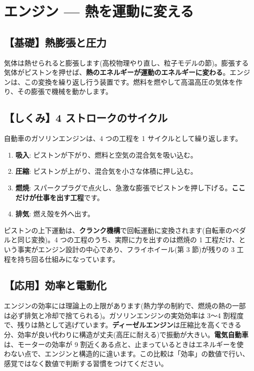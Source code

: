 \documentclass{article}
\begin{document}
\section{エンジン — 熱を運動に変える}

\subsection{【基礎】熱膨張と圧力}

気体は熱せられると膨張します(高校物理やり直し、粒子モデルの節)。膨張する気体がピストンを押せば、\textbf{熱のエネルギーが運動のエネルギーに変わる}。エンジンは、この変換を繰り返し行う装置です。燃料を燃やして高温高圧の気体を作り、その膨張で機械を動かします。

\subsection{【しくみ】4 ストロークのサイクル}

自動車のガソリンエンジンは、4 つの工程を 1 サイクルとして繰り返します。

\begin{enumerate}
\item \textbf{吸入}: ピストンが下がり、燃料と空気の混合気を吸い込む。
\item \textbf{圧縮}: ピストンが上がり、混合気を小さな体積に押し込む。
\item \textbf{燃焼}: スパークプラグで点火し、急激な膨張でピストンを押し下げる。\textbf{ここだけが仕事を出す工程}です。
\item \textbf{排気}: 燃え殻を外へ出す。
\end{enumerate}

ピストンの上下運動は、\textbf{クランク機構}で回転運動に変換されます(自転車のペダルと同じ変換)。4 つの工程のうち、実際に力を出すのは燃焼の 1 工程だけ、という事実がエンジン設計の中心であり、フライホイール(第 3 節)が残りの 3 工程を持ち回る仕組みになっています。

\subsection{【応用】効率と電動化}

エンジンの効率には理論上の上限があります(熱力学の制約で、燃焼の熱の一部は必ず排気と冷却で捨てられる)。ガソリンエンジンの実効効率は 3〜4 割程度で、残りは熱として逃げています。\textbf{ディーゼルエンジン}は圧縮比を高くできる分、効率が良い代わりに構造が丈夫(高圧に耐える)で振動が大きい。\textbf{電気自動車}は、モーターの効率が 9 割近くある点と、止まっているときはエネルギーを使わない点で、エンジンと構造的に違います。この比較は「効率」の数値で行い、感覚ではなく数値で判断する習慣をつけてください。
\end{document}
